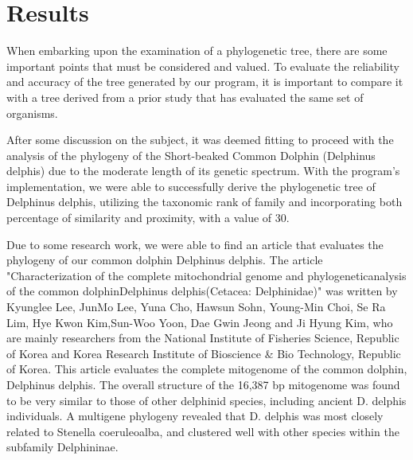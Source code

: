 \documentclass[12pt]{article}
\begin{document}
\section{Results}\label{sec:desenvolvimentos}
When embarking upon the examination of a phylogenetic tree, there are some important points that must be considered and valued. To evaluate the reliability and accuracy of the tree generated by our program, it is important to compare it with a tree derived from a prior study that has evaluated the same set of organisms.

After some discussion on the subject, it was deemed fitting to proceed with the analysis of the phylogeny of the Short-beaked Common Dolphin (Delphinus delphis) due to the moderate length of its genetic spectrum. With the program's implementation, we were able to successfully derive the phylogenetic tree of Delphinus delphis, utilizing the taxonomic rank of family and incorporating both percentage of similarity and proximity, with a value of 30.

Due to some research work, we were able to find an article that evaluates the phylogeny of our common dolphin Delphinus delphis. The article "Characterization of the complete mitochondrial genome and phylogeneticanalysis of the common dolphinDelphinus delphis(Cetacea: Delphinidae)" was written by Kyunglee Lee, JunMo Lee, Yuna Cho, Hawsun Sohn, Young-Min Choi, Se Ra Lim, Hye Kwon Kim,Sun-Woo Yoon, Dae Gwin Jeong and Ji Hyung Kim, who are mainly researchers from the National Institute of Fisheries Science, Republic of Korea and Korea Research Institute of Bioscience \& Bio Technology, Republic of Korea. This article evaluates the complete mitogenome of the common dolphin, Delphinus delphis. The overall structure of the 16,387 bp mitogenome was found to be very similar to those of other delphinid species, including ancient D. delphis individuals. A multigene phylogeny revealed that D. delphis was most closely related to Stenella coeruleoalba, and clustered well with other species within the subfamily Delphininae.
\end{document}
